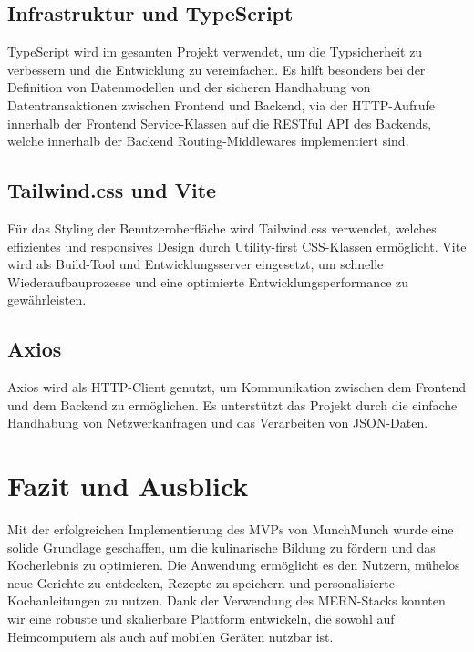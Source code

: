 \documentclass[conference,a4paper,flushend]{cs-techrep}
\begin{document}
\subsection{Infrastruktur und TypeScript}
TypeScript wird im gesamten Projekt verwendet, um die Typsicherheit zu verbessern und die Entwicklung zu vereinfachen. Es hilft besonders bei der Definition von Datenmodellen und der sicheren Handhabung von Datentransaktionen zwischen Frontend und Backend, via der HTTP-Aufrufe innerhalb der Frontend Service-Klassen auf die RESTful API des Backends, welche innerhalb der Backend Routing-Middlewares implementiert sind.

\subsection{Tailwind.css und Vite}
Für das Styling der Benutzeroberfläche wird Tailwind.css\cite{TailwindCSS} verwendet, welches effizientes und responsives Design durch Utility-first CSS-Klassen ermöglicht. Vite wird als Build-Tool und Entwicklungsserver eingesetzt, um schnelle Wiederaufbauprozesse und eine optimierte Entwicklungsperformance zu gewährleisten.

\subsection{Axios}
Axios wird als HTTP-Client genutzt, um Kommunikation zwischen dem Frontend und dem Backend zu ermöglichen. Es unterstützt das Projekt durch die einfache Handhabung von Netzwerkanfragen und das Verarbeiten von JSON-Daten.

\section {Fazit und Ausblick} 
Mit der erfolgreichen Implementierung des MVPs von MunchMunch wurde eine solide Grundlage geschaffen, um die kulinarische Bildung zu fördern und das Kocherlebnis zu optimieren. Die Anwendung ermöglicht es den Nutzern, mühelos neue Gerichte zu entdecken, Rezepte zu speichern und personalisierte Kochanleitungen zu nutzen. Dank der Verwendung des MERN-Stacks konnten wir eine robuste und skalierbare Plattform entwickeln, die sowohl auf Heimcomputern als auch auf mobilen Geräten nutzbar ist.
\end{document}
